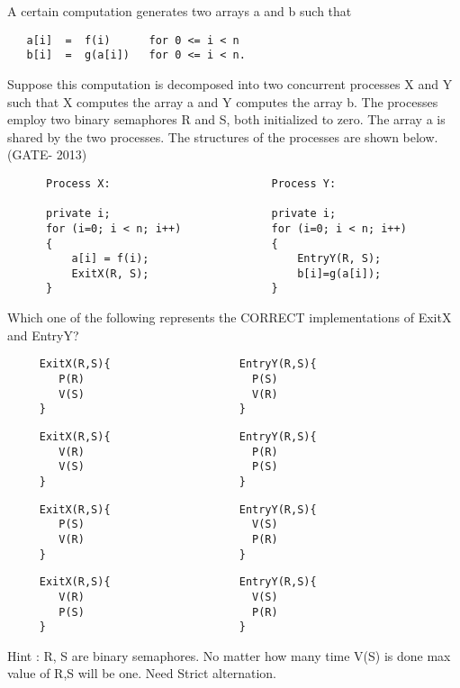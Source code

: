 
\begin{minipage}{\linewidth}

  \question  A certain computation generates two arrays a and b such that

  \begin{lstlisting}
   a[i]  =  f(i)      for 0 <= i < n
   b[i]  =  g(a[i])   for 0 <= i < n.
  \end{lstlisting}

             Suppose this computation is decomposed into two concurrent processes X and Y such that X computes
             the array a and Y computes the array b. The processes employ two binary semaphores R and S,
             both initialized to zero. The array a is shared by the two processes.
             The structures of the processes are shown below. (GATE- 2013)

  \begin{lstlisting}
      Process X:                         Process Y:

      private i;                         private i;
      for (i=0; i < n; i++)              for (i=0; i < n; i++)
      {                                  {
          a[i] = f(i);                       EntryY(R, S);
          ExitX(R, S);                       b[i]=g(a[i]);
      }                                  }
  \end{lstlisting}
  Which one of the following represents the CORRECT implementations of ExitX and EntryY?
  \begin{choices}
    \choice
      \begin{lstlisting}
     ExitX(R,S){                    EntryY(R,S){
        P(R)                          P(S)
        V(S)                          V(R)
     }                              }
  \end{lstlisting}

  \choice
      \begin{lstlisting}
     ExitX(R,S){                    EntryY(R,S){
        V(R)                          P(R)
        V(S)                          P(S)
     }                              }
  \end{lstlisting}

  \choice
      \begin{lstlisting}
     ExitX(R,S){                    EntryY(R,S){
        P(S)                          V(S)
        V(R)                          P(R)
     }                              }
  \end{lstlisting}

  \choice
      \begin{lstlisting}
     ExitX(R,S){                    EntryY(R,S){
        V(R)                          V(S)
        P(S)                          P(R)
     }                              }
  \end{lstlisting}

  \end{choices}
  Hint : R, S are binary semaphores. No matter how many time V(S) is done max value of R,S will be one.
  Need Strict alternation.
  \end{minipage}

